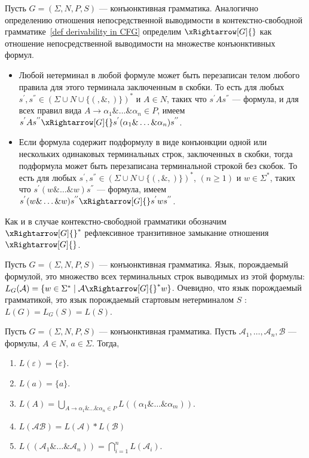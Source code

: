\begin{definition}
    Пусть $G = (\Sigma,N,P,S)$ --- конъюнктивная грамматика. Аналогично определению отношения непосредственной выводимости в контекстно-свободной грамматике~\ref{def derivability in CFG} определим $\xRightarrow[G]{}$ как отношение непосредственной выводимости на множестве конъюнктивных формул.
    \begin{itemize}
        \item Любой нетерминал в любой формуле может быть перезаписан телом любого правила для этого терминала заключенным в скобки. То есть для любых $s^{'},s^{''} \in (\Sigma \cup N \cup \{(, \&, )\})^*$ и $A\in N$, таких что $s^{'}As^{''}$ --- формула, и для всех правил вида $A \rightarrow \alpha_1\&\ldots\&\alpha_n \in P$, имеем $s^{'}As^{''}\xRightarrow[G]{}s^{'}(\alpha_1\&\ldots\&\alpha_n)s^{''}$. 
        \item Если формула содержит подформулу в виде конъюнкции одной или нескольких одинаковых терминальных строк, заключенных в скобки, тогда подформула может быть перезаписана терминальной строкой без скобок. То есть для любых $s^{'},s^{''} \in (\Sigma \cup N \cup \{(, \&, )\})^*$, $(n \geqslant 1)$ и $w \in \Sigma^*$, таких что $s^{'}(w\&\ldots\&w)s^{''}$ --- формула, имеем $s^{'}(w\&\ldots\&w)s^{''}\xRightarrow[G]{}s^{'}ws^{''}$.
    \end{itemize}
    Как и в случае контекстно-свободной грамматики обозначим $\xRightarrow[G]{}^*$ рефлексивное транзитивное замыкание отношения $\xRightarrow[G]{}$.
\end{definition}

\begin{definition}
    Пусть $G = (\Sigma,N,P,S)$ --- конъюнктивная грамматика. Язык, порождаемый формулой, это множество всех терминальных строк выводимых из этой формулы: $L_{G}(\mathcal{A}) = \{w\in\Sigma^* \mid \mathcal{A} \xRightarrow[G]{}^*w\}$. Очевидно, что язык порождаемый грамматикой, это язык порождаемый стартовым нетерминалом $S$ : $L(G) = L_{G}(S) = L(S)$.
\end{definition}

\begin{theorem}\label{Theorem language generated by a formula}
    Пусть $G = (\Sigma,N,P,S)$ --- конъюнктивная грамматика. Пусть $\mathcal{A}_1,\ldots,\mathcal{A}_n,\mathcal{B}$ --- формулы, $A \in N$, $a \in \Sigma$. Тогда,
    \begin{enumerate}
        \item $L(\varepsilon) = \{\varepsilon\}$.
        \item $L(a) = \{a\}$.
        \item $L(A) = \bigcup_{A \rightarrow \alpha_1\&\ldots\&\alpha_n \in P} L((\alpha_1\&\ldots\&\alpha_m))$.
        \item $L(\mathcal{AB}) = L(\mathcal{A})*L(\mathcal{B})$
        \item $L((\mathcal{A}_1\&\ldots\&\mathcal{A}_n)) = \bigcap_{i = 1}^{n}L(\mathcal{A}_i)$.
    \end{enumerate}
\end{theorem}

